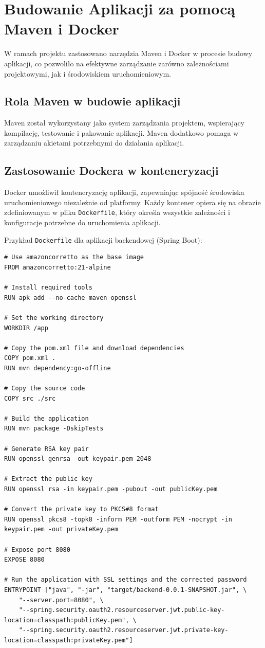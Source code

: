 \section{Budowanie Aplikacji za pomocą Maven i Docker}

W ramach projektu zastosowano narzędzia Maven i Docker w procesie budowy aplikacji, co pozwoliło na efektywne zarządzanie zarówno zależnościami projektowymi, jak i środowiskiem uruchomieniowym.

\subsection{Rola Maven w budowie aplikacji}

Maven został wykorzystany jako system zarządzania projektem, wspierający kompilację, testowanie i pakowanie aplikacji. Maven dodatkowo pomaga w zarządzaniu akietami potrzebnymi do działania aplikacji.

\subsection{Zastosowanie Dockera w konteneryzacji}

Docker umożliwił konteneryzację aplikacji, zapewniając spójność środowiska uruchomieniowego niezależnie od platformy. Każdy kontener opiera się na obrazie zdefiniowanym w pliku \texttt{Dockerfile}, który określa wszystkie zależności i konfiguracje potrzebne do uruchomienia aplikacji.

Przykład \texttt{Dockerfile} dla aplikacji backendowej (Spring Boot):
\begin{verbatim}
# Use amazoncorretto as the base image
FROM amazoncorretto:21-alpine

# Install required tools
RUN apk add --no-cache maven openssl

# Set the working directory
WORKDIR /app

# Copy the pom.xml file and download dependencies
COPY pom.xml .
RUN mvn dependency:go-offline

# Copy the source code
COPY src ./src

# Build the application
RUN mvn package -DskipTests

# Generate RSA key pair
RUN openssl genrsa -out keypair.pem 2048

# Extract the public key
RUN openssl rsa -in keypair.pem -pubout -out publicKey.pem

# Convert the private key to PKCS#8 format
RUN openssl pkcs8 -topk8 -inform PEM -outform PEM -nocrypt -in keypair.pem -out privateKey.pem

# Expose port 8080
EXPOSE 8080

# Run the application with SSL settings and the corrected password
ENTRYPOINT ["java", "-jar", "target/backend-0.0.1-SNAPSHOT.jar", \
    "--server.port=8080", \
    "--spring.security.oauth2.resourceserver.jwt.public-key-location=classpath:publicKey.pem", \
    "--spring.security.oauth2.resourceserver.jwt.private-key-location=classpath:privateKey.pem"]

\end{verbatim}

